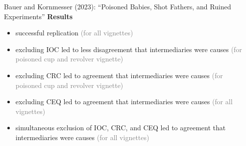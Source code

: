 \documentclass[xcolor=table,9pt,aspectratio=169]{beamer}
\begin{document}
\begin{frame}{\vspace*{10mm}Bauer and Kornmesser (2023): ``Poisoned Babies, Shot Fathers, and Ruined Experiments''}
\vspace*{-5mm}
\textbf{Results}\\
\begin{itemize}
   \item successful replication \textcolor{gray}{(for all vignettes)}
   \item excluding IOC led to less disagreement that intermediaries were causes \textcolor{gray}{(for poisoned cup and revolver vignette)}
   \item excluding CRC led to agreement that intermediaries were causes \textcolor{gray}{(for poisoned cup and revolver vignette)}
   \item excluding CEQ led to agreement that intermediaries were causes \textcolor{gray}{(for all vignettes)}
   \item simultaneous exclusion of IOC, CRC, and CEQ led to agreement that intermediaries were causes \textcolor{gray}{(for all vignettes)}
\end{itemize}
\vfill
{}
\end{frame}
\end{document}
